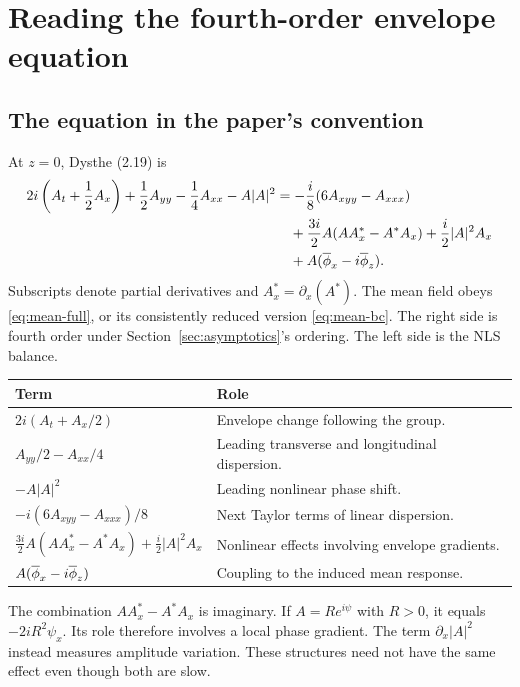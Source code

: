 \section{Reading the fourth-order envelope equation}
\label{sec:dysthe}
\subsection{The equation in the paper's convention}
At $z=0$, Dysthe (2.19) is
\begin{align}
 2i\left(A_t+\frac12A_x\right)
 +\frac12A_{yy}-\frac14A_{xx}-A|A|^2
 &= -\frac{i}{8}(6A_{xyy}-A_{xxx})\notag\\
 &\quad+\frac{3i}{2}A(AA_x^*-A^*A_x)
       +\frac i2|A|^2A_x\notag\\
 &\quad+A(\overline{\phi}_x-i\overline{\phi}_z).
 \label{eq:dysthe-full}
\end{align}
Subscripts denote partial derivatives and $A_x^*=\partial_x(A^*)$.
The mean field obeys \eqref{eq:mean-full}, or its consistently reduced
version \eqref{eq:mean-bc}. The right side is fourth order under
Section~\ref{sec:asymptotics}'s ordering. The left side is the NLS balance.

\begin{center}
\begin{tabular}{@{}p{.34\linewidth}p{.59\linewidth}@{}}
\toprule Term & Role\\\midrule
$2i(A_t+A_x/2)$ & Envelope change following the group.\\
$A_{yy}/2-A_{xx}/4$ & Leading transverse and longitudinal dispersion.\\
$-A|A|^2$ & Leading nonlinear phase shift.\\
$-i(6A_{xyy}-A_{xxx})/8$ & Next Taylor terms of linear dispersion.\\
$\tfrac{3i}{2}A(AA_x^*-A^*A_x)+\tfrac i2|A|^2A_x$
& Nonlinear effects involving envelope gradients.\\
$A(\overline{\phi}_x-i\overline{\phi}_z)$ & Coupling to the induced mean response.\\
\bottomrule
\end{tabular}
\end{center}

The combination $AA_x^*-A^*A_x$ is imaginary. If $A=Re^{i\psi}$ with
$R>0$, it equals $-2iR^2\psi_x$. Its role therefore involves a local phase
gradient. The term $\partial_x|A|^2$ instead measures amplitude variation.
These structures need not have the same effect even though both are slow.

